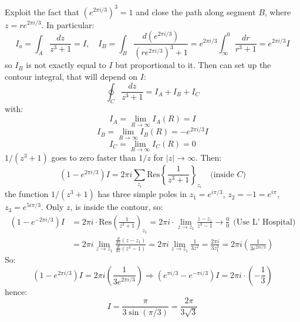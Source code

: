 \documentclass{article}
\begin{document}
\newpage
\noindent
Exploit the fact that $(e^{2\pi i /3})^3 = 1$ and close the path along segment $B$, where $z=re^{2\pi i /3}$. In particular:
\begin{equation}
    I_a = \int_A \frac{dz}{z^3 +1 } = I, \quad I_B = \int_B \frac{d(e^{2\pi i /3})}{(re^{2\pi i /3})^3 + 1} = e^{2\pi i /3} \int_\infty^0 \frac{dr}{r^3+1} = e^{2\pi i /3}I
\end{equation}
so $I_B$ is not exactly equal to $I$ but proportional to it. Then can set up the contour integral, that will depend on $I$:
\begin{equation}
    \oint_C \frac{dz}{z^3 + 1} = I_A + I_B + I_C
\end{equation}
with:
\begin{equation}
    I_A = \lim_{R \rightarrow \infty} I_A(R)=I
\end{equation}
\begin{equation}
    I_B = \lim_{R \rightarrow \infty} I_B(R)=-e^{2\pi i /3} I
\end{equation}
\begin{equation}
    I_C = \lim_{R \rightarrow \infty} I_C(R)=0
\end{equation}
$1/(z^3 + 1)$ goes to zero faster than $1/z$ for $|z| \rightarrow \infty$. Then:
\begin{equation}
    (1-e^{2\pi i /3})I = 2\pi i \sum_{z_i} \text{Res} \left\{ \frac{1}{z^3 +1} \right\}_{z_i} \quad (\text{inside $C$)}
\end{equation}
the function $1/(z^3 + 1)$ has three simple poles in $z_1 = e^{i\pi /3}$, $z_2 = -1 = e^{i\pi}$, $z_3 = e^{5i\pi/3}$. Only $z$, is inside the contour, so:
\begin{align*}
    \left(1 - e^{-2\pi i / 3} \right) I
&= 2\pi i \cdot \text{Res}\left( \frac{1}{z^3 + 1} \right)_{z_1} = 2\pi i \cdot \lim_{z \to z_1} \frac{z - z_1}{z^3 - 1} \rightarrow \frac{0}{0} \ \ \text{(Use L' Hospital)}\\
&= 2\pi i \lim_{z \rightarrow z_1} \frac{\frac{d}{dz} (z-z_1)}{\frac{d}{dz} (z^3 - 1)} = 2\pi i \lim_{z \rightarrow z_1} \frac{1}{3z^2} = \frac{2\pi i}{3z_1 ^2} = 2\pi i \left( \frac{1}{3 e^{2\pi i /3}} \right)
\end{align*}
So:
\begin{equation}
    \left(1 - e^{2\pi i/3}\right) I = 2\pi i \left( \frac{1}{3 e^{2\pi i/3}} \right) \Rightarrow \left(e^{\pi i/3} - e^{-\pi i/3}\right) I = 2\pi i \cdot \left( -\frac{1}{3} \right)
\end{equation}
hence:
\begin{equation}
    I = \frac{\pi}{3\sin{(\pi/3)}} = \frac{2\pi}{3\sqrt{3}}
\end{equation}
\end{document}
